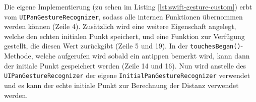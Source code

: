 Die eigene Implementierung (zu sehen im Listing \ref{lst:swift-gesture-custom}) erbt vom \texttt{UIPanGestureRecognizer}, sodass alle internen Funktionen übernommen werden können (Zeile 4).
Zusätzlich wird eine weitere Eigenschaft angelegt, welche den echten initialen Punkt speichert, und eine Funktion zur Verfügung gestellt, die diesen Wert zurückgibt (Zeile 5 und 19).
In der \texttt{touchesBegan()}-Methode, welche aufgerufen wird sobald ein antippen bemerkt wird, kann dann der initiale Punkt gespeichert werden (Zeile 14 und 16).
Nun wird anstelle des \texttt{UIPanGestureRecognizer} der eigene \texttt{InitialPanGestureRecognizer} verwendet und es kann der echte initiale Punkt zur Berechnung der Distanz verwendet werden.

